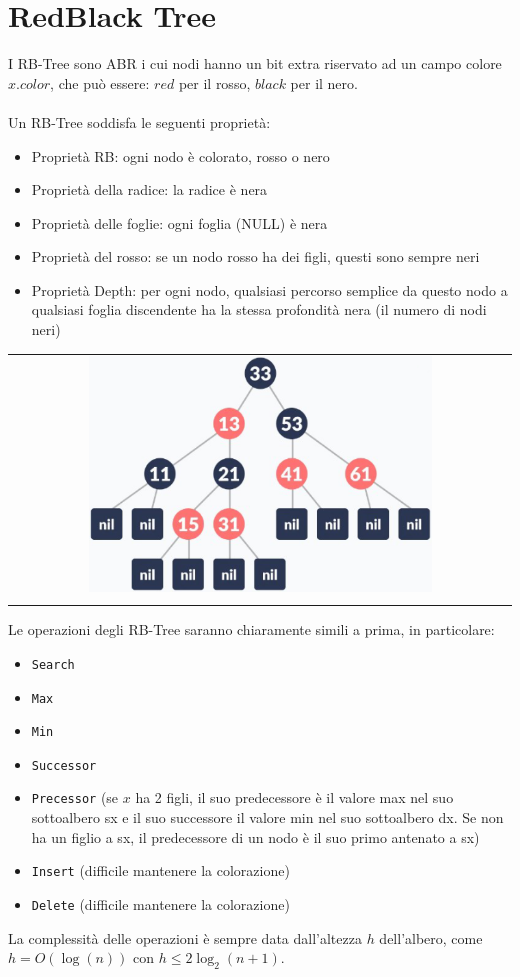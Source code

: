 \section{RedBlack Tree}
I RB-Tree sono ABR i cui nodi hanno un bit extra riservato ad un campo colore $x.color$, che può essere: $red$ per il rosso, $black$ per il nero. \\~\\
Un RB-Tree soddisfa le seguenti proprietà:
\begin{itemize}
    \item Proprietà RB: ogni nodo è colorato, rosso o nero
    \item Proprietà della radice: la radice è nera
    \item Proprietà delle foglie: ogni foglia (NULL) è nera
    \item Proprietà del rosso: se un nodo rosso ha dei figli, questi sono sempre neri
    \item Proprietà Depth: per ogni nodo, qualsiasi percorso semplice da questo nodo a qualsiasi foglia discendente ha la stessa profondità nera (il numero di nodi neri)
\end{itemize}
\begin{center}
    \begin{tabular}{c}
        \\ \includegraphics[width=0.7\textwidth]{image/RB-Tree.png} \\ \\
    \end{tabular}
\end{center}
Le operazioni degli RB-Tree saranno chiaramente simili a prima, in particolare:
\begin{itemize}
    \item \verb|Search|
    \item \verb|Max|
    \item \verb|Min|
    \item \verb|Successor|
    \item \verb|Precessor| (se $x$ ha 2 figli, il suo predecessore è il valore max nel suo sottoalbero sx e il suo successore il valore min nel suo sottoalbero dx. Se non ha un figlio a sx, il predecessore di un nodo è il suo primo antenato a sx)
    \item \verb|Insert| (difficile mantenere la colorazione)
    \item \verb|Delete| (difficile mantenere la colorazione)
\end{itemize}
La complessità delle operazioni è sempre data dall'altezza $h$ dell'albero, come $h = O(\log(n))$ con $h \leq 2 \log_2 (n+1)$. \\~\\
